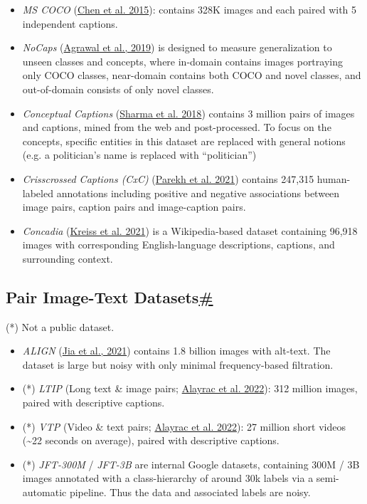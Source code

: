 \begin{itemize}
\tightlist
\item
  \emph{MS COCO} (\href{https://arxiv.org/abs/1504.00325}{Chen et al. 2015}): contains 328K images and each paired with 5 independent captions.
\item
  \emph{NoCaps} (\href{https://arxiv.org/abs/1812.08658}{Agrawal et al., 2019}) is designed to measure generalization to unseen classes and concepts, where in-domain contains images portraying only COCO classes, near-domain contains both COCO and novel classes, and out-of-domain consists of only novel classes.
\item
  \emph{Conceptual Captions} (\href{https://aclanthology.org/P18-1238/}{Sharma et al. 2018}) contains 3 million pairs of images and captions, mined from the web and post-processed. To focus on the concepts, specific entities in this dataset are replaced with general notions (e.g. a politician's name is replaced with ``politician'')
\item
  \emph{Crisscrossed Captions (CxC)} (\href{https://arxiv.org/abs/2004.15020}{Parekh et al. 2021}) contains 247,315 human-labeled annotations including positive and negative associations between image pairs, caption pairs and image-caption pairs.
\item
  \emph{Concadia} (\href{https://arxiv.org/abs/2104.08376}{Kreiss et al. 2021}) is a Wikipedia-based dataset containing 96,918 images with corresponding English-language descriptions, captions, and surrounding context.
\end{itemize}

\subsection{\texorpdfstring{Pair Image-Text Datasets\hyperref[pair-image-text-datasets]{\#}}{Pair Image-Text Datasets\#}}\label{pair-image-text-datasets}

(*) Not a public dataset.

\begin{itemize}
\tightlist
\item
  \emph{ALIGN} (\href{https://arxiv.org/abs/2102.05918}{Jia et al., 2021}) contains 1.8 billion images with alt-text. The dataset is large but noisy with only minimal frequency-based filtration.
\item
  (*) \emph{LTIP} (Long text \& image pairs; \href{https://arxiv.org/abs/2204.14198}{Alayrac et al. 2022}): 312 million images, paired with descriptive captions.
\item
  (*) \emph{VTP} (Video \& text pairs; \href{https://arxiv.org/abs/2204.14198}{Alayrac et al. 2022}): 27 million short videos (\textasciitilde22 seconds on average), paired with descriptive captions.
\item
  (*) \emph{JFT-300M} / \emph{JFT-3B} are internal Google datasets, containing 300M / 3B images annotated with a class-hierarchy of around 30k labels via a semi-automatic pipeline. Thus the data and associated labels are noisy.
\end{itemize}

